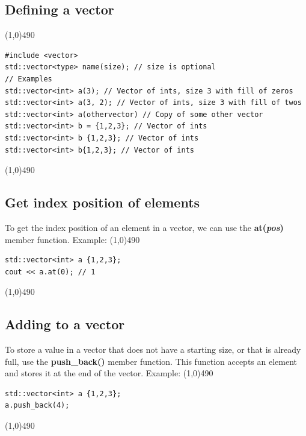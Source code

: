 \documentclass{report}
\begin{document}
    \bigbreak \noindent 
    \subsection{Defining a vector}
    \bigbreak \noindent 
    \line(1,0){490}
    \begin{verbatim}
#include <vector>
std::vector<type> name(size); // size is optional 
// Examples
std::vector<int> a(3); // Vector of ints, size 3 with fill of zeros
std::vector<int> a(3, 2); // Vector of ints, size 3 with fill of twos
std::vector<int> a(othervector) // Copy of some other vector
std::vector<int> b = {1,2,3}; // Vector of ints
std::vector<int> b {1,2,3}; // Vector of ints
std::vector<int> b{1,2,3}; // Vector of ints
    \end{verbatim}
    \line(1,0){490}
    \bigbreak \noindent 

    \bigbreak \noindent 
    \subsection{Get index position of elements}
    \bigbreak \noindent 
    To get the index position of an element in a vector, we can use the \textbf{at(\textit{pos})} member function.
    \bigbreak \noindent 
    Example:
    \bigbreak \noindent 
    \line(1,0){490}
    \begin{verbatim}
std::vector<int> a {1,2,3};
cout << a.at(0); // 1
    \end{verbatim}
    \line(1,0){490}

    \bigbreak \noindent 
    \subsection{Adding to a vector}
    \bigbreak \noindent 
    To store a value in a vector that does not have a starting size, or that is already full, use the \textbf{push\_back()} member function. This function accepts an element and stores it at the end of the vector.
    \bigbreak \noindent 
    Example:
    \bigbreak \noindent 
    \line(1,0){490}
    \begin{verbatim}
std::vector<int> a {1,2,3};
a.push_back(4);
    \end{verbatim}
    \line(1,0){490}
\end{document}
